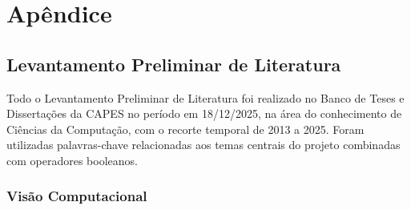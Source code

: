 \chapter*{Apêndice}

\section{Levantamento Preliminar de Literatura}
Todo o Levantamento Preliminar de Literatura foi realizado no Banco de Teses e Dissertações da CAPES no período em 18/12/2025, na área do conhecimento de Ciências da Computação, com o recorte temporal de 2013 a 2025. Foram utilizadas palavras-chave relacionadas aos temas centrais do projeto combinadas com operadores booleanos.
\subsection{Visão Computacional}

